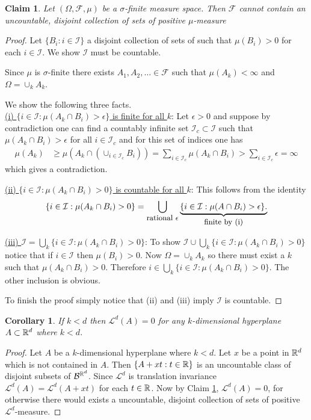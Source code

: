 \documentclass[10pt,letterpaper,twocolumn]{article}
\newtheorem{corollary}{Corollary}
\newtheorem{claim}{Claim}
\begin{document}
\begin{claim}
\label{cc}
Let $(\Omega, \mathcal F,\mu)$ be a $\sigma$-finite measure space. Then $\mathcal F$ cannot contain an uncountable, disjoint collection of sets of positive $\mu$-measure
\end{claim}
\begin{proof}
Let $\{B_i: i\in \mathcal I\}$ a disjoint collection of sets of such that $\mu(B_i)>0$ for each $i\in\mathcal I$.
We show $\mathcal I$ must be countable.


Since $\mu$ is $\sigma$-finite there exists $A_1,A_2,\ldots \in\mathcal F$ such that $\mu(A_k)<\infty$ and $\Omega = \cup_k A_k$.

We show the following three facts.\\
\noindent
\underline{(i) $\{ i\in \mathcal I: \mu(A_k\cap B_i)>\epsilon\}$ is finite for all $k$}:
Let $\epsilon>0$ and suppose by contradiction one can find a countably infinite set  $\mathcal I_c\subset \mathcal I$ such that $\mu(A_k\cap B_i)>\epsilon $ for all $i\in \mathcal I_c$ and for this set of indices one has
\begin{align*}
\mu(A_k)&\geq \mu(A_k\cap (\cup_{i\in\mathcal I_c}B_i ))= \sum_{i\in\mathcal I_c}\mu(A_k\cap B_i) > \sum_{i\in\mathcal I_c}\epsilon =\infty
\end{align*}
which gives a contradiction.


  \vspace{.2cm}
\noindent
\underline{(ii) $\{ i\in \mathcal I: \mu(A_k\cap B_i)>0\}$ is countable for all $k$}:
This follows from the  identity
\[\{ i\in \mathcal I: \mu(A_k\cap B_i)>0\}=\bigcup_\text{\small rational
$\epsilon$} \underbrace{\{ i\in \mathcal I: \mu(A\cap B_i)>\epsilon\}.} _\text{\small finite by (i)}   \]


 \vspace{.2cm}
\noindent
\underline{(iii) $\mathcal I = \bigcup_k \{ i\in \mathcal I: \mu(A_k\cap B_i)>0\}$}:
 To show $\mathcal I \cup \bigcup_k \{ i\in \mathcal I: \mu(A_k\cap B_i)>0\}$ notice that  if $i\in\mathcal I$ then $\mu(B_i)>0$. Now  $\Omega =\cup_k A_k$ so there must exist a $k$ such that $\mu(A_k\cap B_i)>0$.  Therefore $i\in  \bigcup_k \{ i\in \mathcal I: \mu(A_k\cap B_i)>0\}$. The other inclusion is obvious.

 To finish the proof simply notice that (ii) and (iii) imply $\mathcal I$ is countable.
\end{proof}

\begin{corollary}If $k<d$ then
$\mathcal L^d(A)=0$ for any $k$-dimensional hyperplane $A\subset \Bbb R^d$ where $k<d$.
\end{corollary}
\begin{proof}
Let $A$ be a $k$-dimensional hyperplane where $k<d$. Let $x$ be a point in $\Bbb R^d$ which is not  contained in $A$.
Then $\{A+xt: t\in\Bbb R\}$ is an uncountable class of disjoint subsets of $\mathcal B^{\Bbb R^d}$. Since $\mathcal L^d$ is translation invariance $\mathcal L^d(A) = \mathcal L^d(A+xt)$ for each $t\in\Bbb R$. Now by Claim \ref{cc}, $\mathcal L^d(A)=0$, for otherwise there would exists a uncountable, disjoint collection of sets of positive $\mathcal L^d$-measure.
\end{proof}
\end{document}
